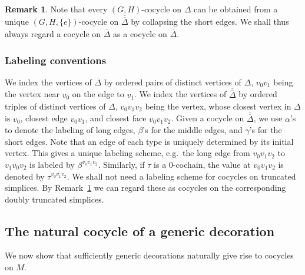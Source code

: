 \documentclass[12pt]{amsart}
\theoremstyle{definition}
\newtheorem{remark}[theorem]{Remark}
\numberwithin{equation}{section}
\def\truncsimp{\overline{\Delta}}
\def\dtruncsimp{\overline{\overline{\Delta}}}
\def\SL{\mathrm{SL}}
\def\PGL{\mathrm{PGL}}
\def\C{\mathbb{C}}
\begin{document}
\begin{remark}\label{rm:InducedCocycle} Note that every $(G,H)$-cocycle on $\truncsimp$ can be obtained from a unique $(G,H,\{e\})$-cocycle on $\dtruncsimp$ by collapsing the short edges. We shall thus always regard a cocycle on $\truncsimp$ as a cocycle on $\dtruncsimp$.
\end{remark}

\subsubsection{Labeling conventions}\label{sec:LabelingConv}
We index the vertices of $\truncsimp$ by ordered pairs of distinct vertices of $\Delta$, $v_0v_1$ being the vertex near $v_0$ on the edge to $v_1$. 
We index the vertices of $\dtruncsimp$ by ordered triples of distinct vertices of $\Delta$, $v_0v_1v_2$ being the vertex, whose closest vertex in $\Delta$ is $v_0$, closest edge $v_0v_1$, and closest face $v_0v_1v_2$. Given a cocycle on $\dtruncsimp$, we use $\alpha$'s to denote the labeling of long edges, $\beta$'s for the middle edges, and $\gamma$'s for the short edges. Note that an edge of each type is uniquely determined by its initial vertex. This gives a unique labeling scheme, e.g.~the long edge from $v_0v_1v_2$ to $v_1v_0v_2$ is labeled by $\beta^{v_0v_1v_2}$. Similarly, if $\tau$ is a $0$-cochain, the value at $v_0v_1v_2$ is denoted by $\tau^{v_0v_1v_2}$.
We shall not need a labeling scheme for cocycles on truncated simplices. By Remark~\ref{rm:InducedCocycle} we can regard these as cocycles on the corresponding doubly truncated simplices. 


%

\subsection{The natural cocycle of a generic decoration}
We now show that sufficiently generic decorations naturally give rise to cocycles on $M$. %
\end{document}
